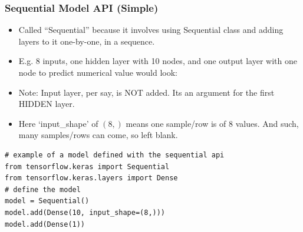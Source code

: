 \begin{frame}[fragile] \frametitle{Sequential Model API (Simple)}

\begin{itemize}
\item Called ``Sequential'' because it involves using Sequential class and adding layers to it one-by-one, in a sequence.
\item E.g. 8 inputs, one hidden layer with 10 nodes, and one output layer with one node to predict numerical value would look:
\item Note: Input layer, per say, is NOT added. Its an argument for the first HIDDEN layer.
\item Here `input\_shape' of $(8,)$ means one sample/row is of 8 values. And such, many samples/rows can come, so left blank.
\end{itemize}
\begin{lstlisting}
# example of a model defined with the sequential api
from tensorflow.keras import Sequential
from tensorflow.keras.layers import Dense
# define the model
model = Sequential()
model.add(Dense(10, input_shape=(8,)))
model.add(Dense(1))
\end{lstlisting}
\end{frame}



